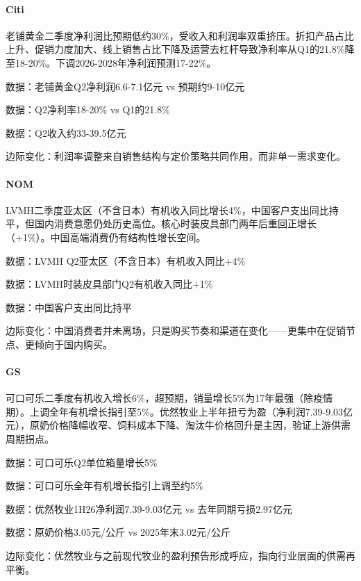 \documentclass[11pt]{ctexart}
\begin{document}
\paragraph{Citi} 老铺黄金二季度净利润比预期低约30\%，受收入和利润率双重挤压。折扣产品占比上升、促销力度加大、线上销售占比下降及运营去杠杆导致净利率从Q1的21.8\%降至18-20\%。下调2026-2028年净利润预测17-22\%。
{\small\color{refgray}数据：老铺黄金Q2净利润6.6-7.1亿元 vs 预期约9-10亿元\par}
{\small\color{refgray}数据：Q2净利率18-20\% vs Q1的21.8\%\par}
{\small\color{refgray}数据：Q2收入约33-39.5亿元\par}
{\small\color{refgray}边际变化：利润率调整来自销售结构与定价策略共同作用，而非单一需求变化。\par}
\paragraph{NOM} LVMH二季度亚太区（不含日本）有机收入同比增长4\%，中国客户支出同比持平，但国内消费意愿仍处历史高位。核心时装皮具部门两年后重回正增长（+1\%）。中国高端消费仍有结构性增长空间。
{\small\color{refgray}数据：LVMH Q2亚太区（不含日本）有机收入同比+4\%\par}
{\small\color{refgray}数据：LVMH时装皮具部门Q2有机收入同比+1\%\par}
{\small\color{refgray}数据：中国客户支出同比持平\par}
{\small\color{refgray}边际变化：中国消费者并未离场，只是购买节奏和渠道在变化——更集中在促销节点、更倾向于国内购买。\par}
\paragraph{GS} 可口可乐二季度有机收入增长6\%，超预期，销量增长5\%为17年最强（除疫情期）。上调全年有机增长指引至5\%。优然牧业上半年扭亏为盈（净利润7.39-9.03亿元），原奶价格降幅收窄、饲料成本下降、淘汰牛价格回升是主因，验证上游供需周期拐点。
{\small\color{refgray}数据：可口可乐Q2单位箱量增长5\%\par}
{\small\color{refgray}数据：可口可乐全年有机增长指引上调至约5\%\par}
{\small\color{refgray}数据：优然牧业1H26净利润7.39-9.03亿元 vs 去年同期亏损2.97亿元\par}
{\small\color{refgray}数据：原奶价格3.05元/公斤 vs 2025年末3.02元/公斤\par}
{\small\color{refgray}边际变化：优然牧业与之前现代牧业的盈利预告形成呼应，指向行业层面的供需再平衡。\par}
\end{document}

